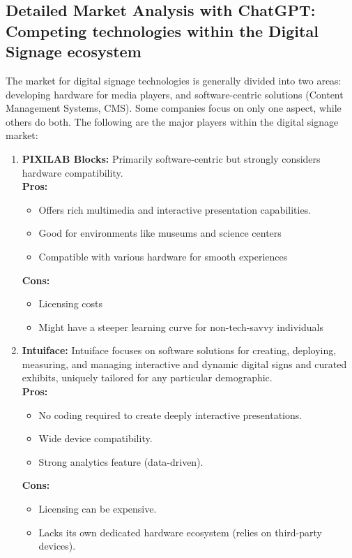\documentclass{exam}
\begin{document}
\begin{center}
\section*{Detailed Market Analysis with ChatGPT: Competing technologies within the Digital Signage ecosystem}
\end{center}

The market for digital signage technologies is generally divided into two areas: developing hardware for media players, and software-centric solutions (Content Management Systems, CMS). Some companies focus on only one aspect, while others do both. The following are the major players within the digital signage market:\\
\bigskip
\begin{enumerate}
\item \textbf{PIXILAB Blocks:} Primarily software-centric but strongly considers hardware compatibility.\\
\bigskip
\textbf{Pros:}\\
\begin{itemize}
\item Offers rich multimedia and interactive presentation capabilities.
\item Good for environments like museums and science centers
\item Compatible with various hardware for smooth experiences
\end{itemize}
\textbf{Cons:}\\
\begin{itemize}
\item Licensing costs
\item Might have a steeper learning curve for non-tech-savvy individuals
\end{itemize}
\bigskip

\item \textbf{Intuiface:} Intuiface focuses on software solutions for creating, deploying, measuring, and managing interactive and dynamic digital signs and curated exhibits, uniquely tailored for any particular demographic.\\
\bigskip
\textbf{Pros:}\\
\begin{itemize}
\item No coding required to create deeply interactive presentations.
\item Wide device compatibility.
\item Strong analytics feature (data-driven).
\end{itemize}
\textbf{Cons:}\\
\begin{itemize}
\item Licensing can be expensive.
\item Lacks its own dedicated hardware ecosystem (relies on third-party devices).
\end{itemize}
\bigskip



\end{enumerate}
\end{document}
